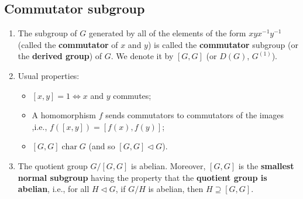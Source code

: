 \subsection*{Commutator subgroup}
\begin{enumerate}[(1)]
	\item The subgroup of $G$ generated by all of the elements of the form $xyx^{-1}y^{-1}$ (called the \textbf{commutator} of $x$ and $y$) is called the \textbf{commutator} subgroup (or the \textbf{derived group}) of $G$. We denote it by $[G,G]$ (or $D(G)$, $G^{(1)}$). 
	\item Usual properties:
	\begin{itemize}
		\item $[x,y]=1\Leftrightarrow x$ and $y$ commutes;
		\item A homomorphism $f$ sends commutators to commutators of the images ,i.e., $f([x,y]) = [f(x),f(y)]$;
		\item $[G,G]\operatorname{char} G$ (and so $[G,G]\lhd G$).
	\end{itemize}
	\item The quotient group $G/[G,G]$ is abelian. Moreover, $[G,G]$ is the \textbf{smallest normal subgroup} having the property that the \textbf{quotient group is abelian}, i.e., for all $H\lhd G$, if $G/H$ is abelian, then $H\supseteq [G,G]$.
\end{enumerate}